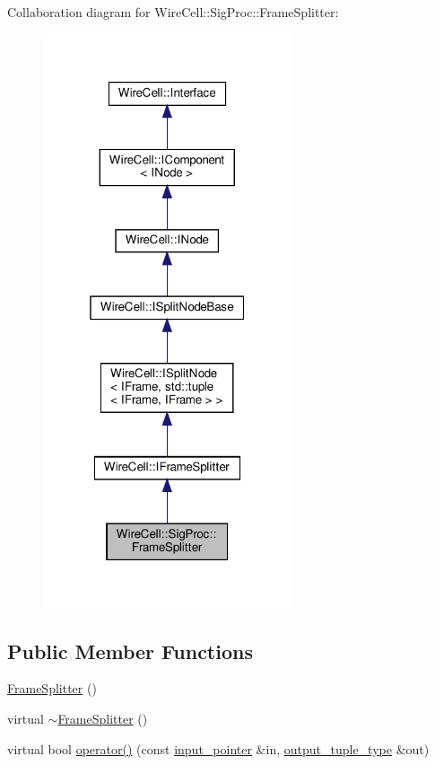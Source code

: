 Collaboration diagram for Wire\+Cell\+:\+:Sig\+Proc\+:\+:Frame\+Splitter\+:
\nopagebreak
\begin{figure}[H]
\begin{center}
\leavevmode
\includegraphics[width=208pt]{class_wire_cell_1_1_sig_proc_1_1_frame_splitter__coll__graph}
\end{center}
\end{figure}
\subsection*{Public Member Functions}
\begin{DoxyCompactItemize}
\item 
\hyperlink{class_wire_cell_1_1_sig_proc_1_1_frame_splitter_a9a5d86c1a9076ad6a8882267edbdb589}{Frame\+Splitter} ()
\item 
virtual \hyperlink{class_wire_cell_1_1_sig_proc_1_1_frame_splitter_a20604c10d1b03ec05ca9f89e6d156805}{$\sim$\+Frame\+Splitter} ()
\item 
virtual bool \hyperlink{class_wire_cell_1_1_sig_proc_1_1_frame_splitter_a1cd01d98b6da5cb6df5fe4941d1564f3}{operator()} (const \hyperlink{class_wire_cell_1_1_i_split_node_a270990964b36cf939159efa595779407}{input\+\_\+pointer} \&in, \hyperlink{class_wire_cell_1_1_i_split_node_acd382a6b5a9c3f322943ce2dd66fa7f4}{output\+\_\+tuple\+\_\+type} \&out)
\end{DoxyCompactItemize}
